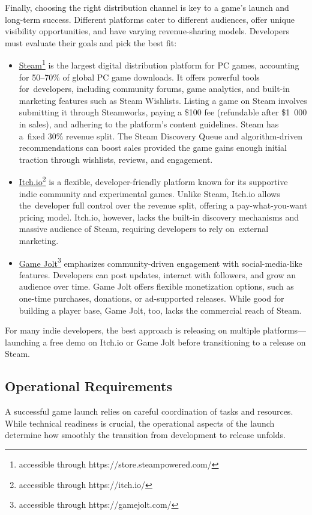 Finally, choosing the right distribution channel is key to a game’s launch and long-term success. Different platforms cater to different audiences, offer unique visibility opportunities, and have varying revenue-sharing models. Developers must evaluate their goals and pick the best fit:
\begin{itemize}
	\item \href{https://store.steampowered.com/}{Steam}\footnote{accessible through https://store.steampowered.com/} is the largest digital distribution platform for PC games, accounting for 50--70\% of global PC game downloads. It offers powerful tools for~developers, including community forums, game analytics, and built-in marketing features such as Steam Wishlists. Listing a game on Steam involves submitting it through Steamworks, paying a \$100 fee (refundable after \$1~000 in sales), and adhering to the platform’s content guidelines. Steam has a~fixed 30\% revenue split. The Steam Discovery Queue and algorithm-driven recommendations can boost sales provided the game gains enough initial traction through wishlists, reviews, and engagement. \cite{steam_wishlist,steam_partner-program,steam_discovery}
	\item \href{https://itch.io/}{Itch.io}\footnote{accessible through https://itch.io/} is a flexible, developer-friendly platform known for its supportive indie community and experimental games. Unlike Steam, Itch.io allows the~developer full control over the revenue split, offering a pay-what-you-want pricing model. Itch.io, however, lacks the built-in discovery mechanisms and massive audience of Steam, requiring developers to rely on~external marketing. \cite{carpenter_creator-day}
	\item \href{https://gamejolt.com/}{Game Jolt}\footnote{accessible through https://gamejolt.com/} emphasizes community-driven engagement with social-media-like features. Developers can post updates, interact with followers, and grow an audience over time. Game Jolt offers flexible monetization options, such as one-time purchases, donations, or ad-supported releases. While good for building a player base, Game Jolt, too, lacks the commercial reach of Steam. \cite{game-jolt_help}
\end{itemize}
For many indie developers, the best approach is releasing on multiple platforms---launching a free demo on Itch.io or Game Jolt before transitioning to a release on Steam.

\subsection{Operational Requirements}
A successful game launch relies on careful coordination of tasks and resources. While technical readiness is crucial, the operational aspects of the launch determine how smoothly the transition from development to release unfolds.

